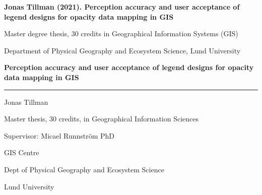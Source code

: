 
   



\setcounter{page}{2}


\textbf{Jonas Tillman (2021). Perception accuracy and user acceptance of legend designs for opacity data mapping in GIS}

Master degree thesis, 30 credits in Geographical Information Systems (GIS) 

Department of Physical Geography and Ecosystem Science, Lund University

\newpage



\begin{center}
    \vspace*{1cm}
        
    \Huge
    \textbf{Perception accuracy and user acceptance of legend designs for opacity data mapping in GIS}
    
    \vspace{5cm}
        
    \rule{15cm}{1.0pt}

    \Large
    Jonas Tillman

    Master thesis, 30 credits, in Geographical Information Sciences
    
    \vspace{2cm}
    
    Supervisor: Micael Runnström PhD

    GIS Centre
    
    Dept of Physical Geography and Ecosystem Science
    
    Lund University
                    
\end{center}

\newpage

